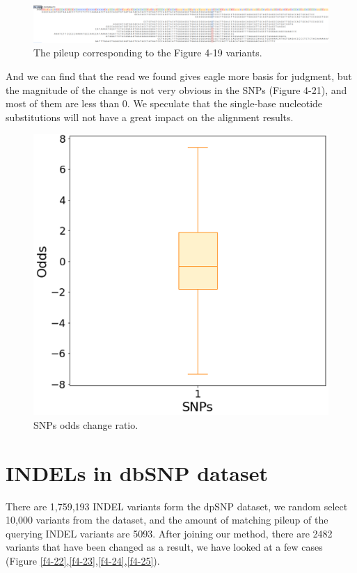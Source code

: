 \vspace{0.5cm}
\begin{figure}[H]
    \centering
    \includegraphics[width=1\columnwidth]{body/image/4-20.png}
    \captionsetup{labelfont=bf}
    \renewcommand{\baselinestretch}{1.0}
    \vspace{-1cm}
    \caption[Figure 4.19 pileup]{The pileup corresponding to the Figure 4-19 variants.}
    \label{f4-20}
\end{figure}

And we can find that the read we found gives eagle more basis for judgment, but the magnitude of the change is not very obvious in the SNPs (Figure 4-21), and most of them are less than 0. We speculate that the single-base nucleotide substitutions will not have a great impact on the alignment results.

\vspace{1cm}
\begin{figure}[H]
    \centering
    \includegraphics[width=0.6\columnwidth]{body/image/4-21.png}
    \captionsetup{labelfont=bf}
    \renewcommand{\baselinestretch}{1.0}
    \caption[SNPs odds change ratio]{SNPs odds change ratio.}
    \label{f4-21}
\end{figure}

\section{INDELs in dbSNP dataset}

There are 1,759,193 INDEL variants form the dpSNP dataset, we random select 10,000 variants from the dataset, and the amount of matching pileup of the querying INDEL variants are 5093. After joining our method, there are 2482 variants that have been changed as a result, we have looked at a few cases  (Figure \ref{f4-22},\ref{f4-23},\ref{f4-24},\ref{f4-25}).

